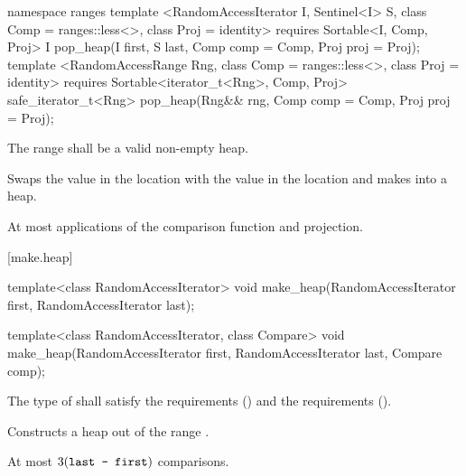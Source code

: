 \begin{addedblock}
%
\begin{itemdecl}
namespace ranges {
  template <RandomAccessIterator I, Sentinel<I> S, class Comp = ranges::less<>,
            class Proj = identity>
      requires Sortable<I, Comp, Proj>
    I pop_heap(I first, S last, Comp comp = Comp{}, Proj proj = Proj{});
  template <RandomAccessRange Rng, class Comp = ranges::less<>, class Proj = identity>
      requires Sortable<iterator_t<Rng>, Comp, Proj>
    safe_iterator_t<Rng> pop_heap(Rng&& rng, Comp comp = Comp{}, Proj proj = Proj{});
}
\end{itemdecl}

\begin{itemdescr}
\pnum
\requires
The range
shall be a valid non-empty heap.

\pnum
\effects
Swaps the value in the location 
with the value in the location
and makes
into a heap.

\pnum
\returns {}

\pnum
\complexity
At most
applications of the comparison function and projection.
\end{itemdescr}
\end{addedblock}

[make.heap]{}

%
\begin{itemdecl}
template<class RandomAccessIterator>
  void make_heap(RandomAccessIterator first, RandomAccessIterator last);

template<class RandomAccessIterator, class Compare>
  void make_heap(RandomAccessIterator first, RandomAccessIterator last,
                 Compare comp);
\end{itemdecl}

\begin{itemdescr}
\pnum
\requires The type of  shall satisfy
the  requirements
() and the
 requirements
().

\pnum
\effects
Constructs a heap out of the range
.

\pnum
\complexity
At most
$3(\texttt{last - first})$
comparisons.
\end{itemdescr}

